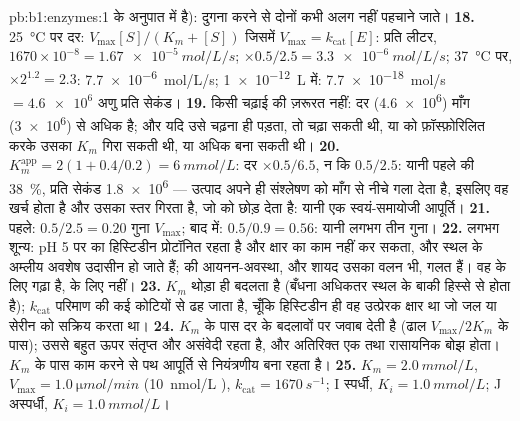 \begin{solution}{pb:b1:enzymes:1}
 के अनुपात में है):  दुगना करने से दोनों  कभी अलग नहीं
पहचाने जाते।
\textbf{18.} \qty{25}{\celsius} पर दर: $V_{\max}[S]/(K_m + [S])$ जिसमें
$V_{\max} = k_{\mathrm{cat}}[E]$: प्रति लीटर, $1670\times 10^{-8} =
\qty{1.67e-5}{mol/L/s}$; $\times 0.5/2.5 = \qty{3.3e-6}{mol/L/s}$;
\qty{37}{\celsius} पर, $\times 2^{1.2} = 2.3$: \qty{7.7e-6}{mol/L/s};
\qty{1e-12}{L} में: \qty{7.7e-18}{mol/s} $= \num{4.6e6}$ अणु प्रति
सेकंड।
\textbf{19.} किसी चढ़ाई की ज़रूरत नहीं: दर (\num{4.6e6}) माँग
(\num{3e6}) से अधिक है; और यदि उसे चढ़ना ही पड़ता, तो  
चढ़ा सकती थी, या  को फ़ॉस्फ़ोरिलित करके उसका $K_m$ गिरा सकती थी, या
अधिक  बना सकती थी।
\textbf{20.} $K_m^{\mathrm{app}} = 2(1 + 0.4/0.2) = \qty{6}{mmol/L}$: दर
$\times 0.5/6.5$, न कि $0.5/2.5$: यानी पहले की \qty{38}{\%},
प्रति सेकंड \num{1.8e6} --- उत्पाद अपने ही संश्लेषण को माँग से नीचे गला
देता है, इसलिए वह खर्च होता है और उसका स्तर गिरता है, जो
 को छोड़ देता है: यानी एक स्वयं-समायोजी आपूर्ति।
\textbf{21.} पहले: $0.5/2.5 = 0.20$ गुना $V_{\max}$; बाद में: $0.5/0.9 =
0.56$: यानी लगभग तीन गुना।
\textbf{22.} लगभग शून्य: pH 5 पर  का हिस्टिडीन
प्रोटॉनित रहता है और क्षार का काम नहीं कर सकता, और स्थल के अम्लीय अवशेष
उदासीन हो जाते हैं;  की आयनन-अवस्था, और शायद उसका वलन भी,
गलत हैं। वह  के लिए गढ़ा है,  के लिए नहीं।
\textbf{23.} $K_m$ थोड़ा ही बदलता है (बँधना अधिकतर स्थल के बाकी हिस्से
से होता है); $k_{\mathrm{cat}}$ परिमाण की कई कोटियों से ढह जाता है, चूँकि
हिस्टिडीन ही वह उत्प्रेरक क्षार था जो जल या सेरीन को सक्रिय करता था।
\textbf{24.} $K_m$ के पास दर  के बदलावों पर जवाब देती है
(ढाल $V_{\max}/2K_m$ के पास); उससे बहुत ऊपर  संतृप्त और
असंवेदी रहता है, और अतिरिक्त  एक  तथा रासायनिक
बोझ होता। $K_m$ के पास काम करने से पथ आपूर्ति से नियंत्रणीय
बना रहता है।
\textbf{25.} $K_m = \qty{2.0}{mmol/L}$, $V_{\max} = \qty{1.0}{\micro mol/min}$
(\qty{10}{nmol/L} ), $k_{\mathrm{cat}} = \qty{1670}{s^{-1}}$; I
स्पर्धी, $K_i = \qty{1.0}{mmol/L}$; J अस्पर्धी, $K_i =
\qty{1.0}{mmol/L}$।
\end{solution}

